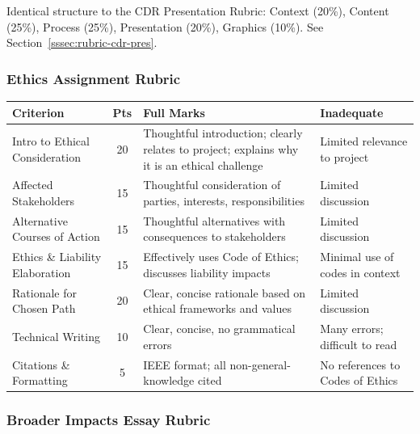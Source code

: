 Identical structure to the CDR Presentation Rubric: Context (20\%), Content (25\%), Process (25\%), Presentation (20\%), Graphics (10\%). See Section~\ref{sssec:rubric-cdr-pres}.

\subsubsection{Ethics Assignment Rubric}
\label{sssec:rubric-ethics}

{\small
\begin{longtable}{p{3.5cm} c p{4cm} p{4cm}}
\toprule
\textbf{Criterion} & \textbf{Pts} & \textbf{Full Marks} & \textbf{Inadequate} \\
\midrule
\endfirsthead
\bottomrule
\endfoot

Intro to Ethical Consideration & 20 & Thoughtful introduction; clearly relates to project; explains why it is an ethical challenge & Limited relevance to project \\
\addlinespace
Affected Stakeholders & 15 & Thoughtful consideration of parties, interests, responsibilities & Limited discussion \\
\addlinespace
Alternative Courses of Action & 15 & Thoughtful alternatives with consequences to stakeholders & Limited discussion \\
\addlinespace
Ethics \& Liability Elaboration & 15 & Effectively uses Code of Ethics; discusses liability impacts & Minimal use of codes in context \\
\addlinespace
Rationale for Chosen Path & 20 & Clear, concise rationale based on ethical frameworks and values & Limited discussion \\
\addlinespace
Technical Writing & 10 & Clear, concise, no grammatical errors & Many errors; difficult to read \\
\addlinespace
Citations \& Formatting & 5 & IEEE format; all non-general-knowledge cited & No references to Codes of Ethics \\

\end{longtable}
}

\subsubsection{Broader Impacts Essay Rubric}
\label{sssec:rubric-broader}

